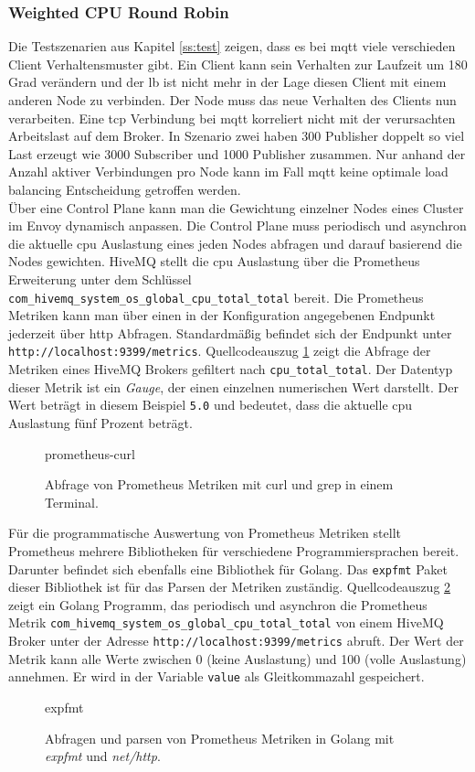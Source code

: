 \subsubsection{Weighted CPU Round Robin} \label{ss:weighted-cpu}
Die Testszenarien aus Kapitel \ref{ss:test} zeigen, dass es bei \ac{mqtt} viele verschieden Client Verhaltensmuster gibt. Ein Client kann sein Verhalten zur Laufzeit um 180 Grad verändern und der \acl{lb} ist nicht mehr in der Lage diesen Client mit einem anderen Node zu verbinden. Der Node muss das neue Verhalten des Clients nun verarbeiten.
Eine \ac{tcp} Verbindung bei \ac{mqtt} korreliert nicht mit der verursachten Arbeitslast auf dem Broker. In Szenario zwei haben 300 Publisher doppelt so viel Last erzeugt wie 3000 Subscriber und 1000 Publisher zusammen.
Nur anhand der Anzahl aktiver Verbindungen pro Node kann im Fall \ac{mqtt} keine optimale load balancing Entscheidung getroffen werden.
\\
Über eine Control Plane kann man die Gewichtung einzelner Nodes eines Cluster im Envoy dynamisch anpassen.
Die Control Plane muss periodisch und asynchron die aktuelle \ac{cpu} Auslastung eines jeden Nodes abfragen und darauf basierend die Nodes gewichten.
HiveMQ stellt die \ac{cpu} Auslastung über die Prometheus Erweiterung unter dem Schlüssel \verb|com_hivemq_system_os_global_cpu_total_total| bereit.
Die Prometheus Metriken kann man über einen in der Konfiguration angegebenen Endpunkt jederzeit über \ac{http} Abfragen. Standardmä{\ss}ig befindet sich der Endpunkt unter \verb|http://localhost:9399/metrics|.
Quellcodeauszug \ref{code:prometheus-curl} zeigt die Abfrage der Metriken eines HiveMQ Brokers gefiltert nach \verb|cpu_total_total|. Der Datentyp dieser Metrik ist ein \textit{Gauge}, der einen einzelnen numerischen Wert darstellt.\cite{prometheusMetricTypesPrometheus} Der Wert beträgt in diesem Beispiel \verb|5.0| und bedeutet, dass die aktuelle \ac{cpu} Auslastung fünf Prozent beträgt.
\begin{figure}
    {prometheus-curl}
    \caption{Abfrage von Prometheus Metriken mit curl und grep in einem Terminal.}
    \label{code:prometheus-curl}
\end{figure}
Für die programmatische Auswertung von Prometheus Metriken stellt Prometheus mehrere Bibliotheken für verschiedene Programmiersprachen bereit. Darunter befindet sich ebenfalls eine Bibliothek für Golang. Das \verb|expfmt| Paket dieser Bibliothek ist für das Parsen der Metriken zuständig.\cite{ExpfmtPkgGo}
Quellcodeauszug \ref{code:expfmt} zeigt ein Golang Programm, das periodisch und asynchron die Prometheus Metrik \verb|com_hivemq_system_os_global_cpu_total_total| von einem HiveMQ Broker unter der Adresse \verb|http://localhost:9399/metrics| abruft. Der Wert der Metrik kann alle Werte zwischen 0 (keine Auslastung) und 100 (volle Auslastung) annehmen. Er wird in der Variable \verb|value| als Gleitkommazahl gespeichert.
\begin{figure}
    {expfmt}
    \caption{Abfragen und parsen von Prometheus Metriken in Golang mit \textit{expfmt} und \textit{net/http}.}
    \label{code:expfmt}
\end{figure}
\\

